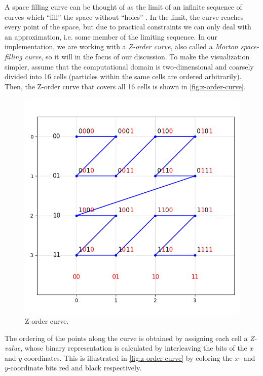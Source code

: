 A space filling curve can be thought of as the limit of an infinite sequence of curves which ``fill'' the space without ``holes'' \cite{WeissteinPlaneFilling}.
In the limit, the curve reaches every point of the space, but due to practical constraints we can only deal with an approximation, i.e. some member of the limiting sequence.
In our implementation, we are working with a \textit{Z-order curve}, also called a \textit{Morton space-filling curve}, so it will in the focus of our discussion.
To make the visualization simpler, assume that the computational domain is two-dimensional and coarsely divided into 16 cells (particles within the same cells are ordered arbitrarily).
Then, the Z-order curve that covers all 16 cells is shown in \autoref{fig:z-order-curve}.
\begin{figure}[htp]
    \centering
    \includegraphics[scale=0.5]{chapters/barnes-hut/img/z-order.png}
    \caption{Z-order curve.}
    \label{fig:z-order-curve}
\end{figure}
The ordering of the points along the curve is obtained by assigning each cell a \textit{Z-value}, whose binary representation is calculated by interleaving the bits of the $x$ and $y$ coordinates.
This is illustrated in \autoref{fig:z-order-curve} by coloring the $x$- and $y$-coordinate bits red and black respectively.


